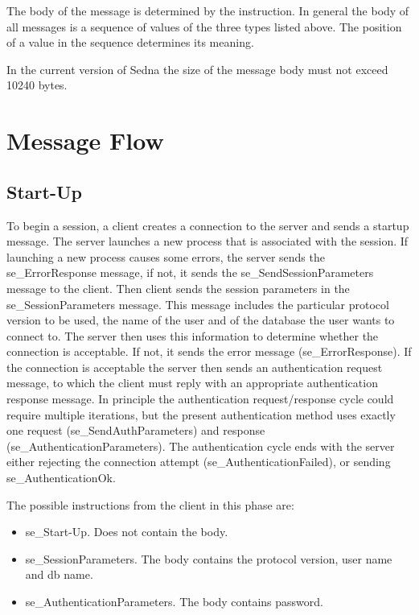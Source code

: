 \documentclass[a4paper,12pt]{article}
\begin{document}
The body of the message is determined by the instruction. In general the body of all messages is a sequence of values of the three types listed above. The position of a value in the sequence determines its meaning. 

In the current version of Sedna the size of the message body must not exceed 10240 bytes.
\section{Message Flow}

\subsection{Start-Up}

To begin a session, a client creates a connection to the server and sends a startup message. The server launches a new process that is associated with the session. If launching a new process causes some errors, the server sends the se\_ErrorResponse message, if not, it sends the se\_SendSessionParameters message to the client. Then client sends the session parameters in the se\_SessionParameters message. This message includes the particular protocol version to be used, the name of the user and of the database the user wants to connect to. The server then uses this information to determine whether the connection is acceptable. If not, it sends the error message (se\_ErrorResponse). If the connection is acceptable the server then sends an authentication request message, to which the client must reply with an appropriate authentication response message. In principle the authentication request/response cycle could require multiple iterations, but the present authentication method uses exactly one request (se\_SendAuthParameters) and response (se\_AuthenticationParameters). The authentication cycle ends with the server either rejecting the connection attempt (se\_AuthenticationFailed), or sending se\_AuthenticationOk. 

The possible instructions from the client in this phase are:
\begin{itemize} 
\item se\_Start-Up. Does not contain the body.
\item se\_SessionParameters. The body contains the protocol version, user name and db name.
\item se\_AuthenticationParameters. The body contains password.
\end{itemize} 
\end{document}
